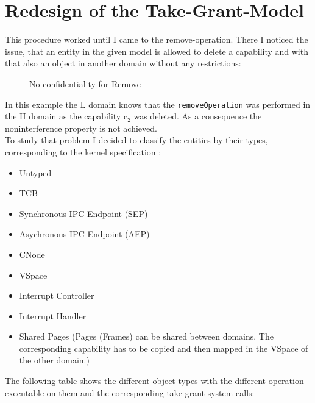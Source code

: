\chapter{Redesign of the Take-Grant-Model}\label{Redesign}
This procedure worked until I came to the remove-operation. There I noticed the issue, that an entity in the given model is allowed to delete a capability and with that also an object in another domain without any restrictions:
\begin{figure}[H]
\caption{No confidentiality for Remove}
\end{figure}
In this example the L domain knows that the \texttt{removeOperation} was performed in the H domain as the capability c$_2$ was deleted. As a consequence the noninterference property is not achieved. \\
To study that problem I decided to classify the entities by their types, corresponding to the kernel specification \cite{Manual}:
\begin{itemize}
\item Untyped 
\item TCB
\item Synchronous IPC Endpoint (SEP)
\item Asychronous IPC Endpoint (AEP)
\item CNode
\item VSpace
\item Interrupt Controller 
\item Interrupt Handler
\item Shared Pages (Pages (Frames) can be shared between domains. The corresponding capability has to be copied and then mapped in the VSpace of the other domain.)
\end{itemize}
The following table shows the different object types with the different operation executable on them and the corresponding take-grant system calls: 
